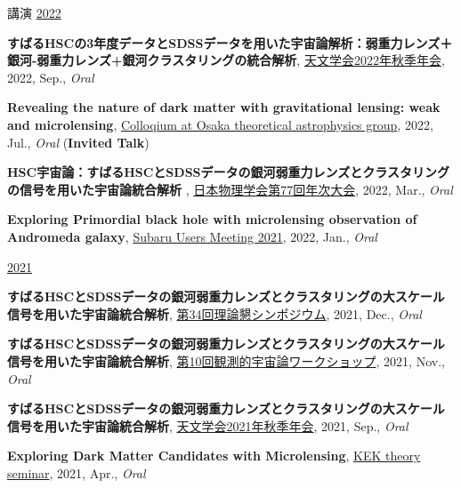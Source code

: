 \begin{rSection}{講演}
\underline{2022}
\begin{etaremune}
\setcounter{enumi}{24}
\item \textbf{すばるHSCの3年度データとSDSSデータを用いた宇宙論解析：弱重力レンズ＋銀河-弱重力レンズ+銀河クラスタリングの統合解析}, \href{https://www.asj.or.jp/nenkai/archive/2022b/pdf/U15a.pdf}{天文学会2022年秋季年会}, 2022, Sep., \textit{Oral}
\item \textbf{Revealing the nature of dark matter with gravitational lensing: weak and microlensing}, \href{http://astro-osaka.jp/OUTAP/colloquium-abstracts.html#sugiyama}{Colloqium at Osaka theoretical astrophysics group}, 2022, Jul., \textit{Oral} (\textbf{Invited Talk})
\item \textbf{HSC宇宙論：すばるHSCとSDSSデータの銀河弱重力レンズとクラスタリングの信号を用いた宇宙論統合解析 }, \href{https://www.jps.or.jp/activities/meetings/annual/annual-index.php}{日本物理学会第77回年次大会}, 2022, Mar., \textit{Oral}
\item \textbf{Exploring Primordial black hole with microlensing observation of Andromeda galaxy}, \href{https://subarutelescope.org/Science/SubaruUM/SubaruUM2021/}{Subaru Users Meeting 2021}, 2022, Jan., \textit{Oral}
\end{etaremune}

\underline{2021}
\begin{etaremune}
\setcounter{enumi}{20}
\item \textbf{すばるHSCとSDSSデータの銀河弱重力レンズとクラスタリングの大スケール信号を用いた宇宙論統合解析}, \href{https://sites.google.com/view/rironkon2021/}{第34回理論懇シンポジウム}, 2021, Dec., \textit{Oral}
\item \textbf{すばるHSCとSDSSデータの銀河弱重力レンズとクラスタリングの大スケール信号を用いた宇宙論統合解析}, \href{https://sites.google.com/view/obscosmws2021main}{第10回観測的宇宙論ワークショップ}, 2021, Nov., \textit{Oral}
\item \textbf{すばるHSCとSDSSデータの銀河弱重力レンズとクラスタリングの大スケール信号を用いた宇宙論統合解析}, \href{https://www.asj.or.jp/nenkai/archive/2021b/pdf/U05a.pdf}{天文学会2021年秋季年会}, 2021, Sep., \textit{Oral}
\item \textbf{Exploring Dark Matter Candidates with Microlensing}, \href{https://www.kek.jp/ja/conference/20210407-3/}{KEK theory seminar}, 2021, Apr., \textit{Oral}
\end{etaremune}


\end{rSection}
